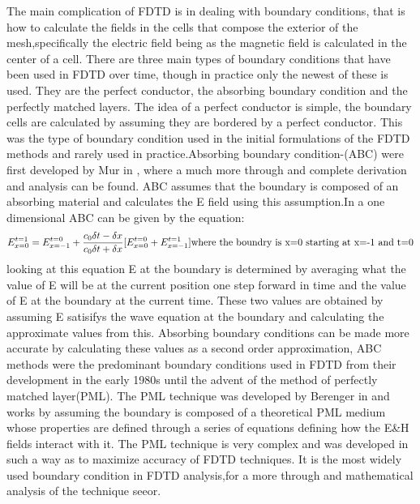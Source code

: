 \documentclass[twocolumn]{article}
\begin{document}
The main complication of FDTD is in dealing with boundary conditions, that is how to calculate the
fields in the cells that compose the exterior of the mesh,specifically the electric field being as
the magnetic field is calculated in the center of a cell. There are three main types of boundary
conditions that have been used in FDTD over time, though in practice only the newest of these is
used. They are the perfect conductor, the absorbing boundary condition and the perfectly matched
layers. The idea of a perfect conductor is simple, the boundary cells are calculated by assuming
they are bordered by a perfect conductor. This was the type of boundary condition used in the
initial formulations of the FDTD methods and rarely used in practice\cite{parallel}.Absorbing
boundary condition-(ABC) were first developed by Mur in \cite{abcsimple}, where a much more through
and complete derivation and analysis can be found. ABC assumes that the boundary is composed of an
absorbing material and calculates the E field using this assumption.In a one dimensional ABC can be
given by the equation:
\begin{equation}\label{ABC}
E_{x=0}^{t=1}=E_{x=-1}^{t=0}+\frac{c_0\delta{t}-\delta{x}}{c_0\delta{t}+\delta{x}}[E_{x=0}^{t=0}+E_{x=-1}^{t=1}]\\
\text{where the boundry is x=0 starting at x=-1 and t=0}
\end{equation}
looking at this equation E at the boundary is determined by averaging what the value of E will be at
the current position one step forward in time and the value of E at the boundary at the current
time. These two values are obtained by assuming E satisifys the wave equation at the boundary and
calculating the approximate values from this. Absorbing boundary conditions can be made more
accurate by calculating these values as a second order approximation, ABC methods were the
predominant boundary conditions used in FDTD from their development in the early 1980s until the
advent of the method of perfectly matched layer(PML). The PML technique was developed by Berenger in
\cite{berenger-pml} and works by assuming the boundary is composed of a theoretical PML medium whose
properties are defined through a series of equations defining how the E\&H fields interact with
it. The PML technique is very complex and was developed in such a way as to maximize accuracy of
FDTD techniques. It is the most widely used boundary condition in FDTD analysis,for a more through
and mathematical analysis of the technique see\cite{berenger-pml}or\cite{parallel}.
\end{document}
